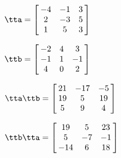 {$\tta = \left[\hskip -3pt \begin{array}{ccc} -4&-1&3\\  2&-3&5
\\  1&5&3\end{array}\hskip -3pt \right]$ 

$\ttb =  \left[\hskip -3pt \begin{array}{ccc} -2&4&3\\  -1&1&-1
\\  4&0&2\end{array}\hskip -3pt \right]$}
{$\tta\ttb = \left[\hskip -3pt \begin{array}{ccc} 21&-17&-5\\  19&5&19
\\  5&9&4\end{array}\hskip -3pt \right]$

$\ttb\tta = \left[\hskip -3pt \begin{array}{ccc} 19&5&23\\  5&-7&-1
\\  -14&6&18\end{array}\hskip -3pt \right]$ }

 

  

  

 

